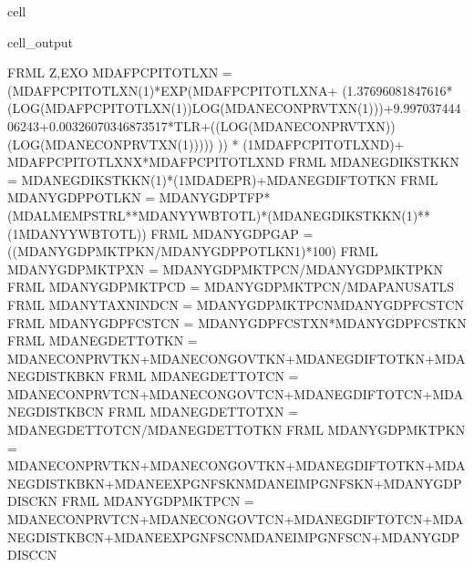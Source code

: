\documentclass[letterpaper,10pt,english]{jupyterBook}
\begin{document}
\begin{sphinxuseclass}{cell}
\begin{sphinxVerbatimOutput}
\begin{sphinxuseclass}{cell_output}
\begin{sphinxVerbatim}[commandchars=\\\{\}]
FRML \PYGZlt{}Z,EXO\PYGZgt{} MDAFPCPITOTLXN = (MDAFPCPITOTLXN(\PYGZhy{}1)*EXP(MDAFPCPITOTLXN\PYGZus{}A+ (\PYGZhy{}1.37696081847616*(LOG(MDAFPCPITOTLXN(\PYGZhy{}1))\PYGZhy{}LOG(MDANECONPRVTXN(\PYGZhy{}1)))+9.99703744406243+0.00326070346873517*T\PYGZus{}LR+((LOG(MDANECONPRVTXN))\PYGZhy{}(LOG(MDANECONPRVTXN(\PYGZhy{}1))))) )) * (1\PYGZhy{}MDAFPCPITOTLXN\PYGZus{}D)+ MDAFPCPITOTLXN\PYGZus{}X*MDAFPCPITOTLXN\PYGZus{}D  \PYGZdl{}
FRML  \PYGZlt{}\PYGZgt{} MDANEGDIKSTKKN = MDANEGDIKSTKKN(\PYGZhy{}1)*(1\PYGZhy{}MDADEPR)+MDANEGDIFTOTKN \PYGZdl{}
FRML  \PYGZlt{}\PYGZgt{} MDANYGDPPOTLKN = MDANYGDPTFP*(MDALMEMPSTRL**MDANYYWBTOTL\PYGZus{})*(MDANEGDIKSTKKN(\PYGZhy{}1)**(1\PYGZhy{}MDANYYWBTOTL\PYGZus{})) \PYGZdl{}
FRML  \PYGZlt{}\PYGZgt{} MDANYGDPGAP\PYGZus{} = ((MDANYGDPMKTPKN/MDANYGDPPOTLKN\PYGZhy{}1)*100) \PYGZdl{}
FRML  \PYGZlt{}\PYGZgt{} MDANYGDPMKTPXN = MDANYGDPMKTPCN/MDANYGDPMKTPKN \PYGZdl{}
FRML  \PYGZlt{}\PYGZgt{} MDANYGDPMKTPCD = MDANYGDPMKTPCN/MDAPANUSATLS \PYGZdl{}
FRML  \PYGZlt{}\PYGZgt{} MDANYTAXNINDCN = MDANYGDPMKTPCN\PYGZhy{}MDANYGDPFCSTCN \PYGZdl{}
FRML  \PYGZlt{}\PYGZgt{} MDANYGDPFCSTCN = MDANYGDPFCSTXN*MDANYGDPFCSTKN \PYGZdl{}
FRML  \PYGZlt{}\PYGZgt{} MDANEGDETTOTKN = MDANECONPRVTKN+MDANECONGOVTKN+MDANEGDIFTOTKN+MDANEGDISTKBKN \PYGZdl{}
FRML  \PYGZlt{}\PYGZgt{} MDANEGDETTOTCN = MDANECONPRVTCN+MDANECONGOVTCN+MDANEGDIFTOTCN+MDANEGDISTKBCN \PYGZdl{}
FRML  \PYGZlt{}\PYGZgt{} MDANEGDETTOTXN = MDANEGDETTOTCN/MDANEGDETTOTKN \PYGZdl{}
FRML  \PYGZlt{}\PYGZgt{} MDANYGDPMKTPKN = MDANECONPRVTKN+MDANECONGOVTKN+MDANEGDIFTOTKN+MDANEGDISTKBKN+MDANEEXPGNFSKN\PYGZhy{}MDANEIMPGNFSKN+MDANYGDPDISCKN \PYGZdl{}
FRML  \PYGZlt{}\PYGZgt{} MDANYGDPMKTPCN = MDANECONPRVTCN+MDANECONGOVTCN+MDANEGDIFTOTCN+MDANEGDISTKBCN+MDANEEXPGNFSCN\PYGZhy{}MDANEIMPGNFSCN+MDANYGDPDISCCN \PYGZdl{}

\end{sphinxVerbatim}
\end{sphinxuseclass}
\end{sphinxVerbatimOutput}
\end{sphinxuseclass}
\end{document}
